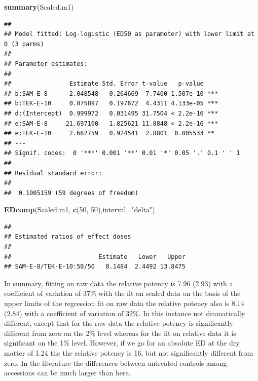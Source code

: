 \documentclass[letterpaper,]{book}
\newenvironment{Shaded}{\begin{snugshade}}{\end{snugshade}}
\newcommand{\DataTypeTok}[1]{\textcolor[rgb]{0.13,0.29,0.53}{#1}}
\newcommand{\DecValTok}[1]{\textcolor[rgb]{0.00,0.00,0.81}{#1}}
\newcommand{\KeywordTok}[1]{\textcolor[rgb]{0.13,0.29,0.53}{\textbf{#1}}}
\newcommand{\NormalTok}[1]{#1}
\newcommand{\StringTok}[1]{\textcolor[rgb]{0.31,0.60,0.02}{#1}}
\begin{document}
\begin{Shaded}
\begin{Highlighting}[]
\KeywordTok{summary}\NormalTok{(Scaled.m1)}
\end{Highlighting}
\end{Shaded}

\begin{verbatim}
## 
## Model fitted: Log-logistic (ED50 as parameter) with lower limit at 0 (3 parms)
## 
## Parameter estimates:
## 
##                Estimate Std. Error t-value   p-value    
## b:SAM-E-8      2.048548   0.264669  7.7400 1.507e-10 ***
## b:TEK-E-10     0.875897   0.197672  4.4311 4.133e-05 ***
## d:(Intercept)  0.999972   0.031495 31.7504 < 2.2e-16 ***
## e:SAM-E-8     21.697160   1.825621 11.8848 < 2.2e-16 ***
## e:TEK-E-10     2.662759   0.924541  2.8801  0.005533 ** 
## ---
## Signif. codes:  0 '***' 0.001 '**' 0.01 '*' 0.05 '.' 0.1 ' ' 1
## 
## Residual standard error:
## 
##  0.1005159 (59 degrees of freedom)
\end{verbatim}

\begin{Shaded}
\begin{Highlighting}[]
\KeywordTok{EDcomp}\NormalTok{(Scaled.m1, }\KeywordTok{c}\NormalTok{(}\DecValTok{50}\NormalTok{, }\DecValTok{50}\NormalTok{),}\DataTypeTok{interval=}\StringTok{"delta"}\NormalTok{)}
\end{Highlighting}
\end{Shaded}

\begin{verbatim}
## 
## Estimated ratios of effect doses
## 
##                        Estimate   Lower   Upper
## SAM-E-8/TEK-E-10:50/50   8.1484  2.4492 13.8475
\end{verbatim}

In summary, fitting on raw data the relative potency is 7.96 (2.93) with a coefficient of variation of 37\% with the fit on scaled data on the basis of the upper limits of the regression fit on raw data the relative potency also is 8.14 (2.84) with a coefficient of variation of 32\%. In this instance not dramatically different, except that for the raw data the relative potency is significantly different from zero on the 2\% level whereas for the fit on relative data it is significant on the 1\% level. However, if we go for an absolute ED at the dry matter of 1.24 the the relative potency is 16, but not significantly different from zero. In the literature the differences between untreated controls among accessions can be much larger than here.
\end{document}
